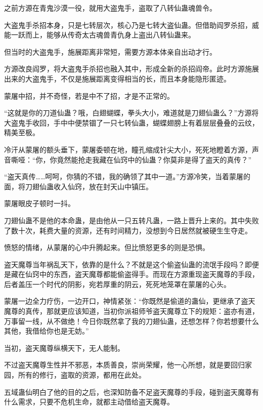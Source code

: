 
\begin{this_body}

之前方源在青鬼沙漠一役，就用大盗鬼手，盗取了八转仙蛊魂兽令。

大盗鬼手杀招本身，只是七转层次，核心乃是七转大盗仙蛊。但借助阎罗杀招，威能一跃而上，能够从传奇太古魂兽青仇身上盗出八转仙蛊来。

但当时的大盗鬼手，施展距离非常短，需要方源本体亲自出动才行。

方源改良阎罗，将大盗鬼手杀招也融入其中，形成全新的杀招阎帝。此时方源施展出来的大盗鬼手，不仅是施展距离变得相当的长，而且本身能隐形匿迹。

蒙屠中招，并不奇怪，若是中不了招，才是不正常的。

“这就是你的刀道仙蛊？哦，白翅蝴蝶，拳头大小，难道就是刀翅仙蛊么？”方源将大盗鬼手收回，手中中便禁锢了一只七转仙蛊，蝴蝶翅膀上有着层层叠叠的云纹，精美至极。

冷汗从蒙屠的额头垂下，蒙屠委顿在地，瞳孔缩成针尖大小，死死地瞪着方源，声音嘶哑：“你，你竟然能抢走我藏在仙窍中的仙蛊？你莫非是得了盗天的真传？”

“盗天真传……呵呵，你猜的不错，我的确领了其中一道。”方源冷笑，当着蒙屠的面，将刀翅仙蛊收入仙窍，放在封天山中镇压。

蒙屠眼皮子顿时一抖。

刀翅仙蛊不是他的本命蛊，是由他从一只五转凡蛊，一路上晋升上来的。其中失败了数十次，耗费大量的资源，还有时间精力，没想到今日居然就被硬生生夺走。

愤怒的情绪，从蒙屠的心中升腾起来。但比愤怒更多的则是恐惧。

盗天魔尊当年祸乱天下，依靠的是什么？不就是这个偷盗仙蛊的流氓手段吗？即便是藏在仙窍中的东西，盗天魔尊都能偷盗得手。而现在方源重现盗天魔尊的手段，后者盖压一个时代的阴影，宛若厚重的阴云，死死地笼罩在蒙屠的心头。

蒙屠一边全力疗伤，一边开口，神情紧张：“你既然是偷道的蛊仙，更继承了盗天魔尊的真传，那就更应该知道，当初你派祖师爷盗天魔尊立下的规矩：盗亦有道，万事留一线，从不做绝！今日你既然拿了我的刀翅仙蛊，还想怎样？你若想要什么其他，我借给你也是无妨。”

当初，盗天魔尊纵横天下，无人能制。

不过盗天魔尊生性并不邪恶，本质善良，崇尚荣耀，他一心所想，就是要回归家园，所有的修行，盗取的资源，都用在此处。

五域蛊仙明白了他的目的之后，也深知防备不足盗天魔尊的手段，碰到盗天魔尊有什么需求，只要不危机生命，就都主动借给盗天魔尊。


\end{this_body}
